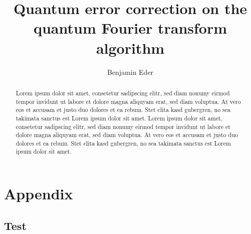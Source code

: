 \documentclass[num-refs]{wiley-networks}
\title{Quantum error correction on the quantum Fourier transform algorithm}
\author[1\authfn{1}]{Benjamin Eder}
\begin{document}
    \maketitle

    \begin{abstract}
        Lorem ipsum dolor sit amet, consetetur sadipscing elitr, sed diam nonumy eirmod tempor invidunt ut labore et dolore magna aliquyam erat, sed diam voluptua. At vero eos et accusam et justo duo dolores et ea rebum. Stet clita kasd gubergren, no sea takimata sanctus est Lorem ipsum dolor sit amet. Lorem ipsum dolor sit amet, consetetur sadipscing elitr, sed diam nonumy eirmod tempor invidunt ut labore et dolore magna aliquyam erat, sed diam voluptua. At vero eos et accusam et justo duo dolores et ea rebum. Stet clita kasd gubergren, no sea takimata sanctus est Lorem ipsum dolor sit amet.
    \end{abstract}


    \tableofcontents

    \setlength{\parskip}{0.2cm}%

    
    
    
    
    
    

    \newpage

    

    \newpage

    \section*{Appendix}
    \label{sec:appendix}

    \subsection*{Test}
\end{document}
